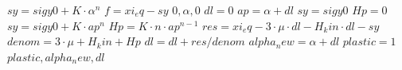%
%



\begin{algorithmic}
\State $sy = sigy0 + K \cdot \alpha^{n}$
\State $f = xi_eq - sy$
    \Return $0, \alpha, 0$
\EndIf
\State $dl = 0$
    \State $ap = \alpha + dl$
        \State $sy = sigy0$
        \State $Hp = 0$
    \Else
        \State $sy = sigy0 + K \cdot ap^{n}$
        \State $Hp = K \cdot n \cdot ap^{n - 1}$
    \EndIf
    \State $res = xi_eq - 3 \cdot \mu \cdot dl - H_kin \cdot dl - sy$
    \State $denom = 3 \cdot \mu + H_kin + Hp$
    \State $dl = dl + res / denom$
\EndFor
\State $alpha_new = \alpha + dl$
\State $plastic = 1$
\Return $plastic, alpha_new, dl$
\end{algorithmic}
